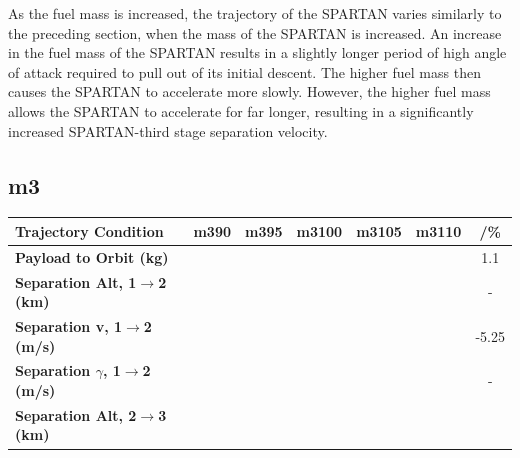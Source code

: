 As the fuel mass is increased, the trajectory of the SPARTAN varies similarly to the preceding section, when the mass of the SPARTAN is increased. An increase in the fuel mass of the SPARTAN results in a slightly longer period of high angle of attack required to pull out of its initial descent. The higher fuel mass then causes the SPARTAN to accelerate more slowly. However, the higher fuel mass allows the SPARTAN to accelerate for far longer, resulting in a significantly increased SPARTAN-third stage separation velocity. 

\subsection{m3}

\begin{table}[ht]
	\centering
	\begin{tabular}{l c c c c c c} 
		\hline \textbf{Trajectory Condition}
		&m390
		&m395
		&m3100
		&m3105
		&m3110
		& /\%
		\\
		\hline \textbf{Payload to Orbit (kg)}
		& \PayloadToOrbitmThreeNinety
		& \PayloadToOrbitmThreeNinetyFive
		& \PayloadToOrbitmThreeStandard
		& \PayloadToOrbitmThreeOneHundredFive
		& \PayloadToOrbitmThreeOneHundredTen
		&1.1
		\\
		\textbf{Separation Alt, 1$\rightarrow$2 (km)}
		& \firstsecondSeparationAltmThreeNinety
		& \firstsecondSeparationAltmThreeNinetyFive
		& \firstsecondSeparationAltmThreeStandard
		& \firstsecondSeparationAltmThreeOneHundredFive
		& \firstsecondSeparationAltmThreeOneHundredTen
		& -
		\\
		\textbf{Separation v, 1$\rightarrow$2 (m/s)}
		& \firstsecondSeparationvmThreeNinety
		& \firstsecondSeparationvmThreeNinetyFive
		& \firstsecondSeparationvmThreeStandard
		& \firstsecondSeparationvmThreeOneHundredFive
		& \firstsecondSeparationvmThreeOneHundredTen
		&-5.25
		\\
		\textbf{Separation $\gamma$, 1$\rightarrow$2 (m/s)}
		& \firstsecondSeparationgammamThreeNinety
		& \firstsecondSeparationgammamThreeNinetyFive
		& \firstsecondSeparationgammamThreeStandard
		& \firstsecondSeparationgammamThreeOneHundredFive
		& \firstsecondSeparationgammamThreeOneHundredTen
		& -
		\\
		\textbf{Separation Alt, 2$\rightarrow$3 (km)}
		& \secondthirdSeparationAltmThreeNinety
		& \secondthirdSeparationAltmThreeNinetyFive
		& \secondthirdSeparationAltmThreeStandard
		& \secondthirdSeparationAltmThreeOneHundredFive
		& \secondthirdSeparationAltmThreeOneHundredTen

\end{tabular}
\end{table}
